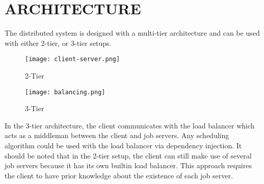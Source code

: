 \section{ARCHITECTURE}\label{sec:architecture}

The distributed system is designed with a multi-tier
architecture and can be used with either 2-tier, or 3-tier
setups.

\begin{figure}[H]
    \centering
    \texttt{[image: client-server.png]}
    \caption{2-Tier}
\end{figure}

\begin{figure}[H]
    \centering
    \texttt{[image: balancing.png]}
    \caption{3-Tier}
\end{figure}

In the 3-tier architecture, the client communicates with the load balancer
which acts as a middleman between the client and job servers.
Any scheduling algorithm could be used with the load balancer via
dependency injection.
It should be noted that in the 2-tier setup, the client can still make use
of several job servers because it has its own builtin load balancer.
This approach requires the client to have prior knowledge about
the existence of each job server.
